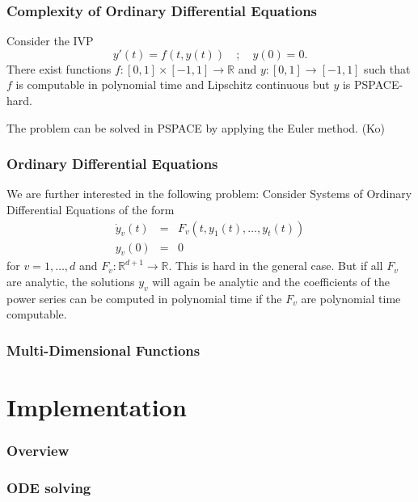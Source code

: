 \documentclass[handout,xcolor=pdftex,dvipsnames,table]{beamer}
\newcommand{\RR}{\ensuremath{\mathbb{R}}}
\begin{document}
\begin{frame}
\frametitle{Complexity of Ordinary Differential Equations}
\begin{theorem}[Kawamura, 2010]
Consider the IVP
$$
y'(t)=f(t,y(t)) \quad;\quad y(0)=0.
$$
\pause
There exist functions $f: [0,1] \times [-1,1] \to \RR$ and $y: [0,1] \to [-1,1]$
such that $f$ is computable in polynomial time and Lipschitz continuous
but $y$ is PSPACE-hard.
\end{theorem}
The problem can be solved in PSPACE by applying the Euler method. (Ko)
\end{frame}
\begin{frame}
  \frametitle{Ordinary Differential Equations}
  We are further interested in the following problem:\newline
Consider Systems of Ordinary Differential Equations of the form
\begin{eqnarray*}
  \dot y_v(t) &=& F_v(t, y_1(t), \dots, y_t(t)) \\
  y_v(0) &=& 0 
\end{eqnarray*}
for $v=1,\dots,d$ and $F_v : \RR^{d+1} \to \RR$.
\pause
This is hard in the general case.
\pause
But if all $F_v$ are analytic, the solutions $y_v$ will again be analytic and the coefficients of the power series
can be computed in polynomial time if the $F_v$ are polynomial time computable.
  \end{frame}
\begin{frame}
  \frametitle{Multi-Dimensional Functions}
  \end{frame}
\section{Implementation}
\begin{frame}
  \frametitle{Overview}
  \end{frame}
\begin{frame}
  \frametitle{ODE solving}
  \end{frame}
%
\end{document}
